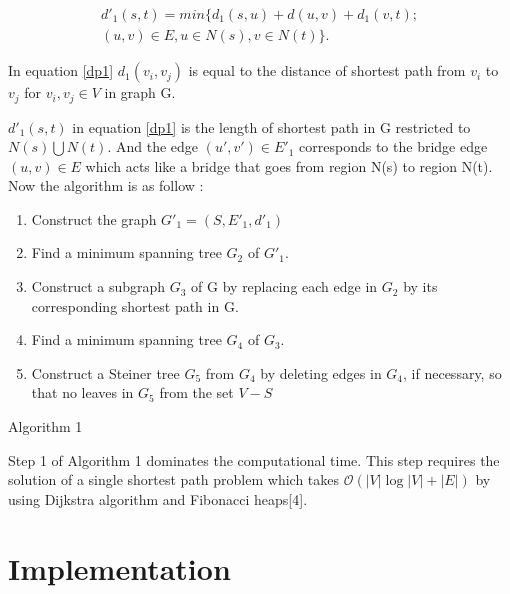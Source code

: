 \documentclass[a4paper,10pt]{article}
\begin{document}
\begin{flushleft}
\begin{equation}\label{dp1}
\begin{split}
d'_1(s,t) = min \{d_1(s,u)+d(u,v)+d_1(v,t);\\ (u,v)\in E , u\in N(s), v\in N(t) \}.
\end{split}
\end{equation}

In equation \ref{dp1} $ d_1(v_i,v_j)$ is equal to the distance of shortest path from $v_i$ to $v_j$ for $v_i,v_j \in V$ in graph G.
   
\end{flushleft}
$d'_1(s,t)$ in equation \ref{dp1} is the length of shortest path in G restricted to $N(s) \bigcup N(t)$. And the edge $(u',v')\in E'_1$ corresponds to the bridge edge $(u,v) \in E$ which acts like a bridge that goes from region N(s) to region N(t). Now the algorithm is as follow :\\
	{\em 
	\begin{enumerate}
			\item Construct the graph $G'_1=(S,E'_1,d'_1)$ 
			
			\item Find a minimum spanning tree $G_2$ of $G'_1$.
					
			\item Construct a subgraph $G_3$ of G by replacing each edge in $G_2$ by its corresponding shortest path in G.
					
			\item Find a minimum spanning tree $G_4$ of $G_3$.		
			\item Construct a Steiner tree $G_5$ from $G_4$ by deleting edges in $G_4$, if necessary, so that no leaves in $G_5$ from the set $V-S$ 
		\end{enumerate}	
	\begin{center}
	Algorithm 1
	\end{center}
	}
Step 1 of Algorithm 1 dominates the computational time. This step requires the solution of a single shortest path problem which takes $ \mathcal{O}(|V|\log{} |V| + |E|)$ by using Dijkstra algorithm and Fibonacci heaps[4].

\section{Implementation}
\end{document}
